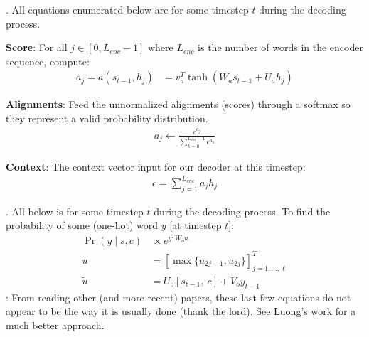 \documentclass[11pt]{article}
\begin{document}
\myspace 
\p {}. All equations enumerated below are for some timestep $t$ during the decoding process.
\begin{compactenum}
	\item \textbf{Score}: For all $j \in [0, L_{enc}-1]$ where $L_{enc}$ is the number of words in the encoder sequence, compute:
	\begin{align}
	a_j = a(s_{t - 1}, h_j) &= v_a^T \tanh\left( W_a s_{t - 1} + U_a h_j \right)
	\end{align}
	
	\item \textbf{Alignments}: Feed the unnormalized alignments (scores) through a softmax so they represent a valid probability distribution.
	\begin{align}
	a_j \leftarrow \frac{e^{a_j}}{\sum_{k = 0}^{L_{enc}-1} e^{a_k}}
	\end{align}
	
	\item \textbf{Context}: The context vector input for our decoder at this timestep:
	\begin{align}
	c = \sum_{j = 1}^{L_{enc}} a_j h_j
	\end{align}
\end{compactenum}

\myspace
\p {}. All below is for some timestep $t$ during the decoding process. To find the probability of some (one-hot) word $y$ [at timestep $t$]:
\begin{align}
\Pr\left(y \mid s, c \right) &\propto e^{y^T W_o u} \\
u &= \left[\max\{ \tilde u_{2j - 1}, \tilde u_{2j} \}\right]_{j = 1,\ldots, \ell}^T \\
\tilde u &= U_o [s_{t - 1}, ~ c] + V_o y_{t - 1}
\end{align}
: From reading other (and more recent) papers, these last few equations do not appear to be the way it is usually done (thank the lord). See Luong's work for a much better approach.





\end{document}
